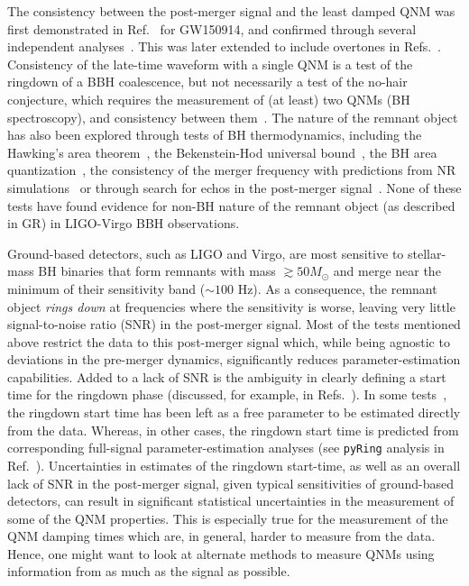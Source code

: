 \documentclass[twocolumn,prd,aps,superscriptaddress,preprintnumbers,tightenlines,showpacs,nofootinbib,eqsecnum,amsfonts,amsmath]{revtex4-1}
\begin{document}
The consistency between the post-merger signal and the least damped QNM was first demonstrated in
Ref.~\cite{TheLIGOScientific:2016src} for GW150914, and confirmed through several independent analyses~\cite{Brito:2018rfr,Carullo:2019flw,Isi:2019aib,CalderonBustillo:2020tjf}. This was later extended to include
overtones in Refs.~\cite{Giesler:2019uxc,Isi:2019aib,Abbott:2020jks}. Consistency of the late-time waveform with a single QNM is a test of the ringdown of
a BBH coalescence, but not necessarily a test of the no-hair
conjecture, which requires the measurement of (at least) two QNMs (BH
spectroscopy), and consistency between them~\cite{Dreyer:2003bv,Gossan:2011ha, Meidam:2014jpa,Carullo:2018sfu,Carullo:2018gah,Isi:2019aib,Bhagwat:2019bwv,Cabero:2019zyt,Maselli:2019mjd}. The nature of the remnant object has also been explored through tests of BH thermodynamics, including the Hawking's area
theorem~\cite{Cabero:2017avf,Isi:2020tac}, the Bekenstein-Hod universal bound~\cite{Carullo:2021yxh}, the BH area quantization~\cite{Foit:2016uxn,Laghi:2020rgl}, the consistency of the merger frequency with predictions from NR simulations~\cite{Carullo:2018gah} or through search for echos in the post-merger signal~\cite{Nielsen:2018lkf,Tsang:2019zra,Lo:2018sep,Abedi:2018npz,Abedi:2020sgg,Testa:2018bzd}.  None of these tests have found evidence for non-BH nature of the remnant
object (as described in GR) in LIGO-Virgo BBH observations.

Ground-based detectors, such as LIGO and Virgo, are most sensitive to
stellar-mass BH binaries that form remnants with mass $\gtrsim 50 M_{\odot}$ and merge near the
minimum of their sensitivity band ($\sim 100$ Hz). As a consequence, the
remnant object \textit{rings down} at frequencies where the sensitivity is worse, leaving
very little signal-to-noise ratio (SNR) in the
post-merger signal. Most of the tests mentioned above restrict the data to this post-merger signal which, while being agnostic to deviations in the pre-merger dynamics, significantly reduces parameter-estimation capabilities. Added to a lack of SNR is the ambiguity in clearly defining a start time for the ringdown phase (discussed, for example, in Refs.~\cite{Berti:2007fi,Baibhav:2017jhs,Bhagwat:2017tkm}). In some tests~\cite{Carullo:2018gah,Carullo:2019flw}, the ringdown start time has been left as a
free parameter to be estimated directly from the data. Whereas, in other cases, the ringdown start time is predicted from corresponding full-signal parameter-estimation analyses (see \texttt{pyRing} analysis in Ref.~\cite{Abbott:2020jks}). Uncertainties
in estimates of the ringdown start-time, as well as an overall lack of
SNR in the post-merger signal, given typical sensitivities of
ground-based detectors, can result in significant statistical uncertainties in the measurement of some of the QNM properties. This is especially true for the measurement of the QNM damping times which are, in general, harder to measure from the data. Hence, one might want to look at alternate methods to measure QNMs using information from as much as the signal as possible.
\end{document}
